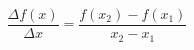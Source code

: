 \documentclass[preview]{standalone}
\begin{document}
\begin{align*}
\dfrac{\Delta f(x)}{\Delta x} = \dfrac{f(x_2) - f(x_1)}{x_2 - x_1}
\end{align*}
\end{document}
